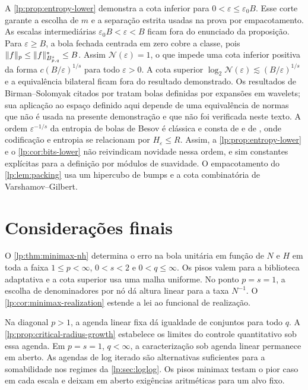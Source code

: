 \documentclass[12pt,a4paper]{article}
\begin{document}
\begin{observacao}
\label{lp:obs:entropy}
A \cref{lp:prop:entropy-lower} demonstra a cota inferior para $0<\varepsilon\le\varepsilon_0B$. Esse corte garante a escolha de $m$ e a separação estrita usadas na prova por empacotamento. As escalas intermediárias $\varepsilon_0B<\varepsilon<B$ ficam fora do enunciado da proposição. Para $\varepsilon\ge B$, a bola fechada centrada em zero cobre a classe, pois $\|f\|_p\le\|f\|^*_{B^{s}_{p,q}}\le B$. Assim $\mathcal N(\varepsilon)=1$, o que impede uma cota inferior positiva da forma $c(B/\varepsilon)^{1/s}$ para todo $\varepsilon>0$. A cota superior $\log_2\mathcal N(\varepsilon)\lesssim(B/\varepsilon)^{1/s}$ e a equivalência bilateral ficam fora do resultado demonstrado. Os resultados de Birman–Solomyak citados por \citet[Teorema~1]{lp-kerkyacharianpicard2003} tratam bolas definidas por expansões em wavelets; sua aplicação ao espaço definido aqui depende de uma equivalência de normas que não é usada na presente demonstração e que não foi verificada neste texto. A ordem $\varepsilon^{-1/s}$ da entropia de bolas de Besov é clássica \citep{lp-birmansolomyak1967} e consta de \citet{lp-kerkyacharianpicard2003} e de \citet[Teorema~1.1]{lp-cohen2001}, onde codificação e entropia se relacionam por $H_\varepsilon\le R$. Assim, a \cref{lp:prop:entropy-lower} e o \cref{lp:cor:bits-lower} não reivindicam novidade nessa ordem, e sim constantes explícitas para a definição por módulos de suavidade. O empacotamento do \cref{lp:lem:packing} usa um hipercubo de bumps e a cota combinatória de Varshamov--Gilbert.
\end{observacao}

\section{Considerações finais}
O \cref{lp:thm:minimax-nh} determina o erro na bola unitária em função de $N$ e $H$ em toda a faixa $1\le p<\infty$, $0<s<2$ e $0<q\le\infty$. Os pisos valem para a biblioteca adaptativa e a cota superior usa uma malha uniforme. No ponto $p=s=1$, a escolha de denominadores por nó dá altura linear para a taxa $N^{-1}$. O \cref{lp:cor:minimax-realization} estende a lei ao funcional de realização.

Na diagonal $p>1$, a agenda linear fixa dá igualdade de conjuntos para todo $q$. A \cref{lp:prop:critical-radius-growth} estabelece os limites do controle quantitativo sob essa agenda. Em $p=s=1$, $q<\infty$, a caracterização sob agenda linear permanece em aberto. As agendas de log iterado são alternativas suficientes para a somabilidade nos regimes da \cref{lp:sec:loglog}. Os pisos minimax testam o pior caso em cada escala e deixam em aberto exigências aritméticas para um alvo fixo.
\end{document}
